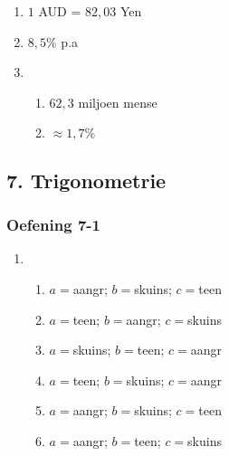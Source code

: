 {\begin{multicols}{3}
\begin{enumerate}[label=\textbf{\arabic*}.]
	\item $1$ AUD = $82,03$ Yen%

	\item $8,5\%$ p.a%

\item
\begin{enumerate}[noitemsep, label=\textbf{(\alph*)} ]
    \item $62,3$ miljoen mense
    \item $\approx 1,7\%$
\end{enumerate}

    \end{enumerate}


\end{multicols}

\subsection* {7. Trigonometrie}
\begin{multicols}{3}
\subsubsection*{Oefening 7-1} %

\begin{enumerate}[noitemsep, label=\textbf{\arabic*}. ]
\item %
\begin{enumerate}[noitemsep, label=\textbf{(\alph*)} ]
\item $a=$aangr; $b=$skuins; $c=$teen
\item $a=$teen; $b=$aangr; $c=$skuins
\item $a=$skuins; $b=$teen; $c=$aangr
\item $a=$teen; $b=$skuins; $c=$aangr
\item $a=$aangr; $b=$skuins; $c=$teen
\item $a=$aangr; $b=$teen; $c=$skuins
\end{enumerate}




\end{enumerate}
\end{multicols}}
